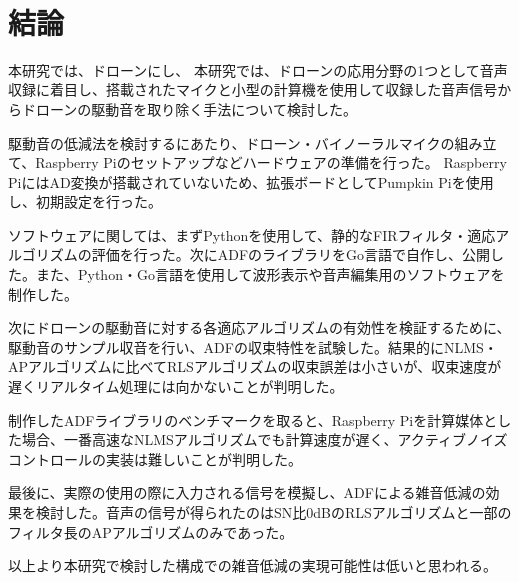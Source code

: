 \
\section{結論}\label{ux7d50ux8ad6}

本研究では、ドローンにし、
本研究では、ドローンの応用分野の1つとして音声収録に着目し、搭載されたマイクと小型の計算機を使用して収録した音声信号からドローンの駆動音を取り除く手法について検討した。

駆動音の低減法を検討するにあたり、ドローン・バイノーラルマイクの組み立て、Raspberry
Piのセットアップなどハードウェアの準備を行った。 Raspberry
PiにはAD変換が搭載されていないため、拡張ボードとしてPumpkin
Piを使用し、初期設定を行った。

ソフトウェアに関しては、まずPythonを使用して、静的なFIRフィルタ・適応アルゴリズムの評価を行った。次にADFのライブラリをGo言語で自作し、公開した。また、Python・Go言語を使用して波形表示や音声編集用のソフトウェアを制作した。

次にドローンの駆動音に対する各適応アルゴリズムの有効性を検証するために、駆動音のサンプル収音を行い、ADFの収束特性を試験した。結果的にNLMS・APアルゴリズムに比べてRLSアルゴリズムの収束誤差は小さいが、収束速度が遅くリアルタイム処理には向かないことが判明した。

制作したADFライブラリのベンチマークを取ると、Raspberry
Piを計算媒体とした場合、一番高速なNLMSアルゴリズムでも計算速度が遅く、アクティブノイズコントロールの実装は難しいことが判明した。

最後に、実際の使用の際に入力される信号を模擬し、ADFによる雑音低減の効果を検討した。音声の信号が得られたのはSN比0dBのRLSアルゴリズムと一部のフィルタ長のAPアルゴリズムのみであった。

以上より本研究で検討した構成での雑音低減の実現可能性は低いと思われる。
